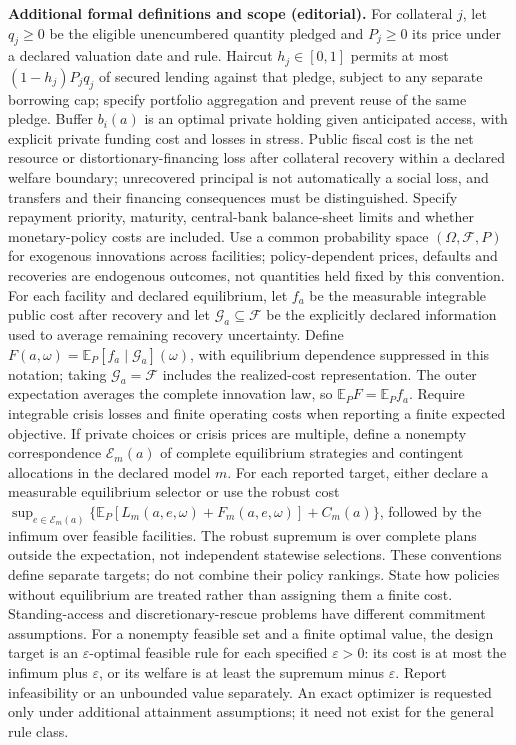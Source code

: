 \documentclass[11pt,a4paper]{article}
\newcommand{\E}{\mathbb E}
\begin{document}
\textbf{Additional formal definitions and scope (editorial).} For collateral \(j\), let \(q_j\geq0\) be the eligible unencumbered quantity pledged and \(P_j\geq0\) its price under a declared valuation date and rule. Haircut \(h_j\in[0,1]\) permits at most \((1-h_j)P_j q_j\) of secured lending against that pledge, subject to any separate borrowing cap; specify portfolio aggregation and prevent reuse of the same pledge. Buffer \(b_i(a)\) is an optimal private holding given anticipated access, with explicit private funding cost and losses in stress. Public fiscal cost is the net resource or distortionary-financing loss after collateral recovery within a declared welfare boundary; unrecovered principal is not automatically a social loss, and transfers and their financing consequences must be distinguished. Specify repayment priority, maturity, central-bank balance-sheet limits and whether monetary-policy costs are included. Use a common probability space \((\Omega,\mathcal F,P)\) for exogenous innovations across facilities; policy-dependent prices, defaults and recoveries are endogenous outcomes, not quantities held fixed by this convention. For each facility and declared equilibrium, let \(f_a\) be the measurable integrable public cost after recovery and let \(\mathcal G_a\subseteq\mathcal F\) be the explicitly declared information used to average remaining recovery uncertainty. Define \(F(a,\omega)=\E_P[f_a\mid\mathcal G_a](\omega)\), with equilibrium dependence suppressed in this notation; taking \(\mathcal G_a=\mathcal F\) includes the realized-cost representation. The outer expectation averages the complete innovation law, so \(\E_P F=\E_P f_a\). Require integrable crisis losses and finite operating costs when reporting a finite expected objective. If private choices or crisis prices are multiple, define a nonempty correspondence \(\mathcal E_m(a)\) of complete equilibrium strategies and contingent allocations in the declared model \(m\). For each reported target, either declare a measurable equilibrium selector or use the robust cost \(\sup_{e\in\mathcal E_m(a)}\{\E_P[L_m(a,e,\omega)+F_m(a,e,\omega)]+C_m(a)\}\), followed by the infimum over feasible facilities. The robust supremum is over complete plans outside the expectation, not independent statewise selections. These conventions define separate targets; do not combine their policy rankings. State how policies without equilibrium are treated rather than assigning them a finite cost. Standing-access and discretionary-rescue problems have different commitment assumptions. For a nonempty feasible set and a finite optimal value, the design target is an \(\varepsilon\)-optimal feasible rule for each specified \(\varepsilon>0\): its cost is at most the infimum plus \(\varepsilon\), or its welfare is at least the supremum minus \(\varepsilon\). Report infeasibility or an unbounded value separately. An exact optimizer is requested only under additional attainment assumptions; it need not exist for the general rule class.
\end{document}
